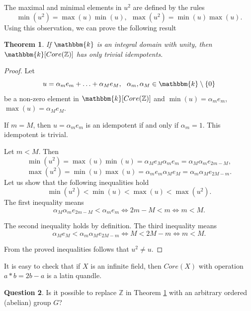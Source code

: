 \documentclass[12pt]{amsart}
\newtheorem{thm}{Theorem}[section]
\theoremstyle{definition}
\newtheorem{qst}[thm]{Question}
\theoremstyle{remark}
\newcommand{\Z}{\mathbb{Z}}
\begin{document}
The maximal and minimal elements in $u^2$ are defined by the rules
$$
\min(u^2) = \max(u) \min(u),~~\max(u^2) = \min(u) \max(u).
$$
Using this observation, we can prove the following result

\begin{thm}\label{Thm3.1}
If $\mathbbm{k}$ is an integral domain with unity,
then  $\mathbbm{k}[Core(\mathbb{Z})]$ has only trivial idempotents. 
\end{thm} 


\begin{proof}
Let 
$$
u = \alpha_m e_m + \ldots + \alpha_M e_M, ~~\alpha_m, \alpha_M \in \mathbbm{k} \setminus \{0 \}
$$
be a non-zero element in $\mathbbm{k}[Core(\mathbb{Z})]$ and $\min(u) = \alpha_m e_m$, $\max(u) = \alpha_M e_M$.

If $m = M$, then $u = \alpha_m e_m$ is an idempotent if and only if $\alpha_m = 1$. This idempotent is trivial.

Let $m < M$. Then
$$
\min(u^2) = \max(u) \min(u) = \alpha_M e_M \alpha_m e_m = \alpha_M  \alpha_m e_{2m-M},
$$
$$
\max(u^2) = \min(u) \max(u) = \alpha_m e_m \alpha_M e_M  = \alpha_m  \alpha_M e_{2M-m}.
$$
Let us show that the following inequalities hold
$$
\min(u^2) < \min(u) < \max(u) < \max(u^2).
$$
The first inequality means
$$
\alpha_M  \alpha_m e_{2m-M} < \alpha_m e_{m} \Leftrightarrow 2m-M < m \Leftrightarrow m < M.
$$

The second inequality holds by definition.  The third  inequality means
$$
\alpha_M e_{M} < \alpha_m  \alpha_M e_{2M-m}  \Leftrightarrow M < 2M - m \Leftrightarrow m < M.
$$

From the proved inequalities follows that $u^2 \not= u$.
\end{proof}


It is easy to check that  if $X$ is an infinite field, then $Core (X)$ with operation $a * b = 2 b - a$ is a latin quandle.

\begin{qst}
Is it possible to replace $\Z$ in Theorem \ref{Thm3.1} with an arbitrary  ordered (abelian) group $G$? 

\end{qst}
\end{document}
